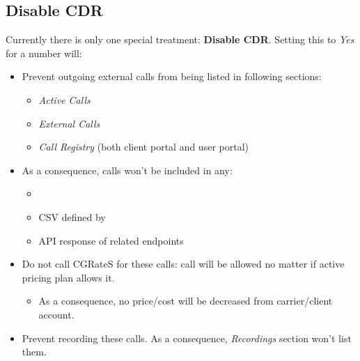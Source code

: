 \documentclass[letterpaper,10pt,spanish]{sphinxmanual}
\begin{document}
\subsection{Disable CDR}
\label{administration_portal/platform/global_special_numbers:disable-cdr}
Currently there is only one special treatment: \textbf{Disable CDR}. Setting this to \emph{Yes} for a number will:
\begin{itemize}
\item {} 
Prevent outgoing external calls from being listed in following sections:
\begin{itemize}
\item {} 
\emph{Active Calls}

\item {} 
\emph{External Calls}

\item {} 
\emph{Call Registry} (both client portal and user portal)

\end{itemize}

\item {} 
As a consequence, calls won't be included in any:
\begin{itemize}
\item {} 
{\hyperref[administration_portal/brand/invoicing/invoices:invoices]{}}

\item {} 
CSV defined by {\hyperref[administration_portal/brand/calls/call_csv_schedulers:call\string-csv\string-schedulers]{}}

\item {} 
API response of related endpoints

\end{itemize}

\item {} 
Do not call CGRateS for these calls: call will be allowed no matter if active pricing plan allows it.
\begin{itemize}
\item {} 
As a consequence, no price/cost will be decreased from carrier/client account.

\end{itemize}

\item {} 
Prevent recording these calls. As a consequence, \emph{Recordings} section won't list them.

\end{itemize}
\end{document}
